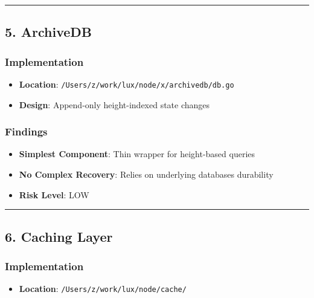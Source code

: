 \documentclass[
]{article}
\providecommand{\tightlist}{%
  \setlength{\itemsep}{0pt}\setlength{\parskip}{0pt}}
\begin{document}
\begin{center}\rule{0.5\linewidth}{0.5pt}\end{center}

\subsection{5. ArchiveDB}\label{5-archivedb}

\subsubsection{Implementation}\label{implementation-4}

\begin{itemize}
\tightlist
\item
  \textbf{Location}: \texttt{/Users/z/work/lux/node/x/archivedb/db.go}
\item
  \textbf{Design}: Append-only height-indexed state changes
\end{itemize}

\subsubsection{Findings}\label{findings-4}

\begin{itemize}
\tightlist
\item
  \textbf{Simplest Component}: Thin wrapper for height-based queries
\item
  \textbf{No Complex Recovery}: Relies on underlying
  database\textquotesingle s durability
\item
  \textbf{Risk Level}: LOW
\end{itemize}

\begin{center}\rule{0.5\linewidth}{0.5pt}\end{center}

\subsection{6. Caching Layer}\label{6-caching-layer}

\subsubsection{Implementation}\label{implementation-5}

\begin{itemize}
\tightlist
\item
  \textbf{Location}: \texttt{/Users/z/work/lux/node/cache/}
\end{itemize}
\end{document}
